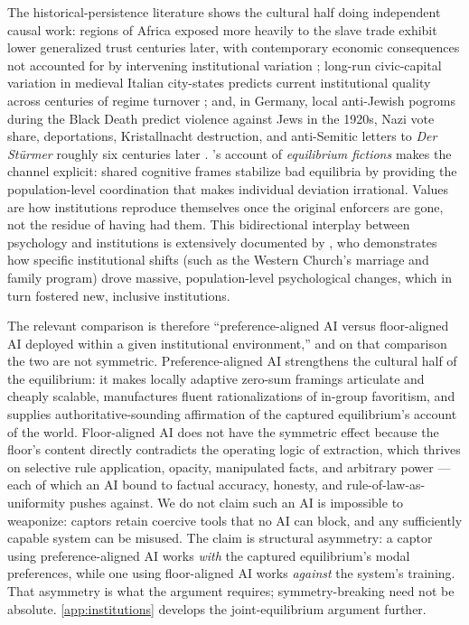 \documentclass{article}
\theoremstyle{plain}
\theoremstyle{definition}
\theoremstyle{remark}
\begin{document}
The historical-persistence literature shows the cultural half doing independent causal work: regions of Africa exposed more heavily to the slave trade exhibit lower generalized trust centuries later, with contemporary economic consequences not accounted for by intervening institutional variation \citep{nunnwantchekon2011}; long-run civic-capital variation in medieval Italian city-states predicts current institutional quality across centuries of regime turnover \citep{guiso2016long, nunn2009importance}; and, in Germany, local anti-Jewish pogroms during the Black Death predict violence against Jews in the 1920s, Nazi vote share, deportations, Kristallnacht destruction, and anti-Semitic letters to \emph{Der St\"urmer} roughly six centuries later \citep{voigtlaender2012persecution}. \citet{hoffstiglitz2010, hoffstiglitz2016striving}'s account of \emph{equilibrium fictions} makes the channel explicit: shared cognitive frames stabilize bad equilibria by providing the population-level coordination that makes individual deviation irrational. Values are how institutions reproduce themselves once the original enforcers are gone, not the residue of having had them. This bidirectional interplay between psychology and institutions is extensively documented by \citet{henrich2020weirdest}, who demonstrates how specific institutional shifts (such as the Western Church's marriage and family program) drove massive, population-level psychological changes, which in turn fostered new, inclusive institutions.

The relevant comparison is therefore ``preference-aligned AI versus floor-aligned AI deployed within a given institutional environment,'' and on that comparison the two are not symmetric. Preference-aligned AI strengthens the cultural half of the equilibrium: it makes locally adaptive zero-sum framings articulate and cheaply scalable, manufactures fluent rationalizations of in-group favoritism, and supplies authoritative-sounding affirmation of the captured equilibrium's account of the world. Floor-aligned AI does not have the symmetric effect because the floor's content directly contradicts the operating logic of extraction, which thrives on selective rule application, opacity, manipulated facts, and arbitrary power --- each of which an AI bound to factual accuracy, honesty, and rule-of-law-as-uniformity pushes against. We do not claim such an AI is impossible to weaponize: captors retain coercive tools that no AI can block, and any sufficiently capable system can be misused. The claim is structural asymmetry: a captor using preference-aligned AI works \emph{with} the captured equilibrium's modal preferences, while one using floor-aligned AI works \emph{against} the system's training. That asymmetry is what the argument requires; symmetry-breaking need not be absolute. \cref{app:institutions} develops the joint-equilibrium argument further.
\end{document}
